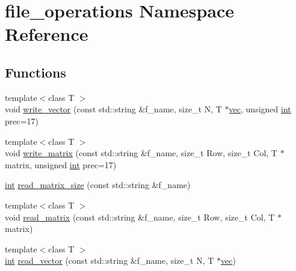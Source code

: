 \hypertarget{namespacefile__operations}{\section{file\-\_\-operations Namespace Reference}
\label{namespacefile__operations}
}
\subsection*{Functions}
\begin{DoxyCompactItemize}
\item 
{\footnotesize template$<$class T $>$ }\\void \hyperlink{namespacefile__operations_ad47b52441906a522136b4747fb171c98}{write\-\_\-vector} (const std\-::string \&f\-\_\-name, size\-\_\-t N, T $\ast$\hyperlink{classvec}{vec}, unsigned \hyperlink{classint}{int} prec=17)
\item 
{\footnotesize template$<$class T $>$ }\\void \hyperlink{namespacefile__operations_a97599bb490f136dfc7a7acada893e864}{write\-\_\-matrix} (const std\-::string \&f\-\_\-name, size\-\_\-t Row, size\-\_\-t Col, T $\ast$matrix, unsigned \hyperlink{classint}{int} prec=17)
\item 
\hyperlink{classint}{int} \hyperlink{namespacefile__operations_aaf70668c562b4de63d013559c973421b}{read\-\_\-matrix\-\_\-size} (const std\-::string \&f\-\_\-name)
\item 
{\footnotesize template$<$class T $>$ }\\void \hyperlink{namespacefile__operations_ab172154a56e387286e268908708af0b5}{read\-\_\-matrix} (const std\-::string \&f\-\_\-name, size\-\_\-t Row, size\-\_\-t Col, T $\ast$matrix)
\item 
{\footnotesize template$<$class T $>$ }\\\hyperlink{classint}{int} \hyperlink{namespacefile__operations_a51aa2a1be8873c4f64256b06bf1ac578}{read\-\_\-vector} (const std\-::string \&f\-\_\-name, size\-\_\-t N, T $\ast$\hyperlink{classvec}{vec})
\end{DoxyCompactItemize}


